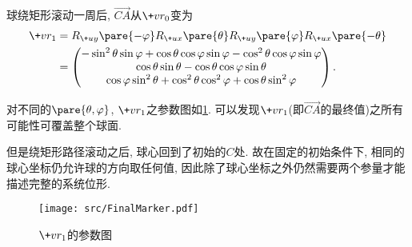 \documentclass{ctexart}
\begin{document}
\begin{cenum}
    \item 球绕矩形滚动一周后, $\overrightarrow{CA}$从$\+vr_0$变为
    \begin{align*}
        \+vr_1 &= R_{\+uy}\pare{-\varphi}R_{\+ux}\pare{\theta}R_{\+uy}\pare{\varphi}R_{\+ux}\pare{-\theta} \\&= \begin{pmatrix}
        -\sin^2\theta \sin\varphi + \cos\theta \cos\varphi \sin\varphi - \cos^2\theta \cos\varphi\sin\varphi \\
        \cos\theta\sin\theta - \cos\theta\cos\varphi\sin\theta \\
        \cos\varphi\sin^2\theta + \cos^2\theta\cos^2\varphi + \cos\theta\sin^2\varphi
    \end{pmatrix}.
    \end{align*}
    \item 对不同的$\pare{\theta,\varphi}$, $\+vr_1$之参数图如\cref{fig:r1的参数图}. 可以发现$\+vr_1$(即$\overrightarrow{CA}$的最终值)之所有可能性可覆盖整个球面.
    \item 但是绕矩形路径滚动之后, 球心回到了初始的$C$处. 故在固定的初始条件下, 相同的球心坐标仍允许球的方向取任何值, 因此除了球心坐标之外仍然需要两个参量才能描述完整的系统位形.
\end{cenum}
\begin{figure}[t]
    \centering
    \texttt{[image: src/FinalMarker.pdf]}
    \caption{$\+vr_1$的参数图}
    \label{fig:r1的参数图}
\end{figure}
\end{document}
